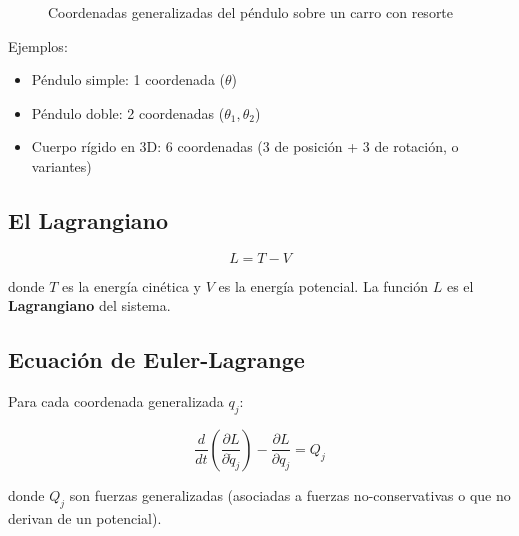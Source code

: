 \begin{figure}[!ht]
    \caption{Coordenadas generalizadas del péndulo sobre un carro con resorte}
    \label{fig:c5_intro_coordenadas_generalizadas}
\end{figure}

Ejemplos:
\begin{itemize}
    \item Péndulo simple: 1 coordenada ($\theta$)
    \item Péndulo doble: 2 coordenadas ($\theta_1, \theta_2$)
    \item Cuerpo rígido en 3D: 6 coordenadas (3 de posición + 3 de rotación, o variantes)
\end{itemize}

\subsection*{El Lagrangiano}

$$L = T - V$$

donde $T$ es la energía cinética y $V$ es la energía potencial. La función $L$ es el \textbf{Lagrangiano} del sistema.

\subsection*{Ecuación de Euler-Lagrange}

Para cada coordenada generalizada $q_j$:

$$\frac{d}{dt}\left(\frac{\partial L}{\partial \dot{q}_j}\right) - \frac{\partial L}{\partial q_j} = Q_j$$

donde $Q_j$ son fuerzas generalizadas (asociadas a fuerzas no-conservativas o que no derivan de un potencial).

